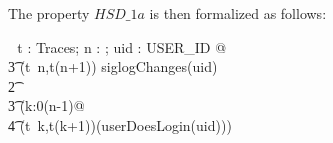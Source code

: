 \documentclass[a4paper,pdftex]{article}
\newcommand{\turnstile}{\vdash \, \,}
\newcommand{\zcomment}[1]{#1}
\newcommand{\proofgoal}[2]{#1\, \turnstile #2}
\begin{document}
The property $HSD\_1a$ is then formalized as follows:
\zcomment{
\begin{zed}
\turnstile \forall t : Traces; n : \nat; uid : USER\_ID @               \\
\t3                           (t~n,t(n+1)) \in siglogChanges(uid)       \\
\t2                        \implies                                     \\
\t3                          (\exists k:0\upto(n-1)@                    \\
\t4                            (t~k,t(k+1))\in(userDoesLogin(uid))) 
\end{zed}
}

\end{document}
